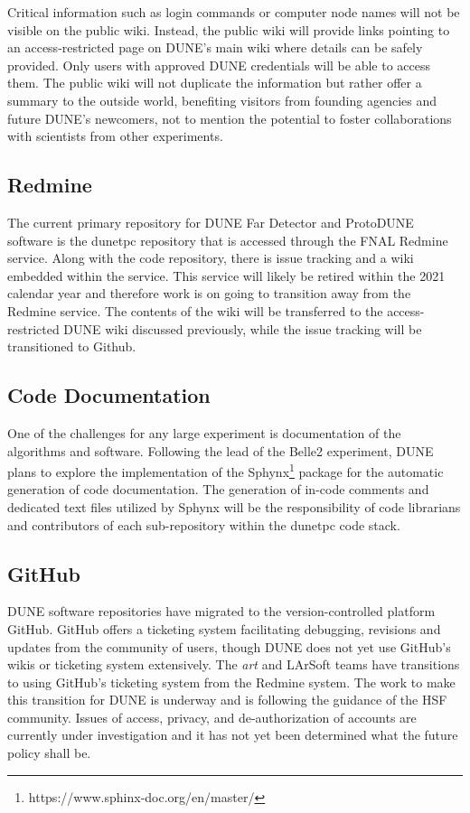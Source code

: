 \documentclass[../main-v1.tex]{subfiles}
\begin{document}
Critical information such as login commands or computer node names will not be visible on the public wiki. Instead, the public wiki will provide links pointing to an access-restricted page on DUNE’s main wiki where details can be safely provided. Only users with approved DUNE credentials will be able to access them. The public wiki will not duplicate the information but rather offer a summary to the outside world, benefiting visitors from founding agencies and future DUNE’s newcomers, not to mention the potential to foster collaborations with scientists from other experiments.

\subsection{Redmine}
The current primary repository for DUNE Far Detector and ProtoDUNE software is the dunetpc repository that is accessed through the FNAL Redmine service. Along with the code repository, there is issue tracking and a wiki embedded within the service. This service will likely be retired within the 2021 calendar year and therefore work is on going to transition away from the Redmine service. The contents of the wiki will be transferred to the access-restricted DUNE wiki discussed previously, while the issue tracking will be transitioned to Github.

\subsection{Code Documentation}
One of the challenges for any large experiment is documentation of the algorithms and software. Following the lead of the Belle2 experiment, DUNE plans to explore the implementation of the Sphynx\footnote{https://www.sphinx-doc.org/en/master/} package for the automatic generation of code documentation. The generation of in-code comments and dedicated text files utilized by Sphynx will be the responsibility of code librarians and contributors of each sub-repository within the dunetpc code stack.


\subsection{GitHub}
DUNE software repositories have migrated to the version-controlled platform GitHub.  GitHub offers a ticketing system facilitating debugging, revisions and updates from the community of users, though DUNE does not yet use GitHub's wikis or ticketing system extensively.  The {\it art} and LArSoft teams have transitions to using GitHub's ticketing system from the Redmine system.  The work to make this transition for DUNE is underway and is following the guidance of the HSF community. Issues of access, privacy, and de-authorization of accounts are currently under investigation and it has not yet been determined what the future policy shall be.
\end{document}
